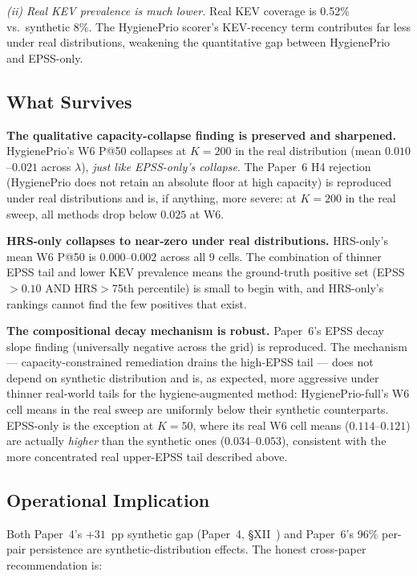 \textit{(ii) Real KEV prevalence is much lower.} Real KEV coverage is
0.52\% vs.\ synthetic 8\%. The HygienePrio scorer's KEV-recency term
contributes far less under real distributions, weakening the
quantitative gap between HygienePrio and EPSS-only.

\subsection{What Survives}

\textbf{The qualitative capacity-collapse finding is preserved and
sharpened.} HygienePrio's W6 P@50 collapses at $K = 200$ in the real
distribution (mean $0.010$--$0.021$ across $\lambda$), \emph{just like
EPSS-only's collapse}. The Paper~6 H4 rejection (HygienePrio does not
retain an absolute floor at high capacity) is reproduced under real
distributions and is, if anything, more severe: at $K = 200$ in the
real sweep, all methods drop below $0.025$ at W6.

\textbf{HRS-only collapses to near-zero under real distributions.}
HRS-only's mean W6 P@50 is $0.000$--$0.002$ across all 9 cells. The
combination of thinner EPSS tail and lower KEV prevalence means the
ground-truth positive set (EPSS$>0.10$ AND HRS$>$75th percentile) is
small to begin with, and HRS-only's rankings cannot find the few
positives that exist.

\textbf{The compositional decay mechanism is robust.} Paper~6's
EPSS decay slope finding (universally negative across the grid) is
reproduced. The mechanism --- capacity-constrained remediation
drains the high-EPSS tail --- does not depend on synthetic
distribution and is, as expected, more aggressive under thinner
real-world tails for the hygiene-augmented method: HygienePrio-full's
W6 cell means in the real sweep are uniformly below their synthetic
counterparts. EPSS-only is the exception at $K = 50$, where its real
W6 cell means ($0.114$--$0.121$) are actually \emph{higher} than the
synthetic ones ($0.034$--$0.053$), consistent with the more
concentrated real upper-EPSS tail described above.

\subsection{Operational Implication}

Both Paper~4's $+31$~pp synthetic gap (Paper~4,
\S XII~\cite{paper4hygieneprio}) and Paper~6's 96\% per-pair
persistence are synthetic-distribution
effects. The honest cross-paper recommendation is:

